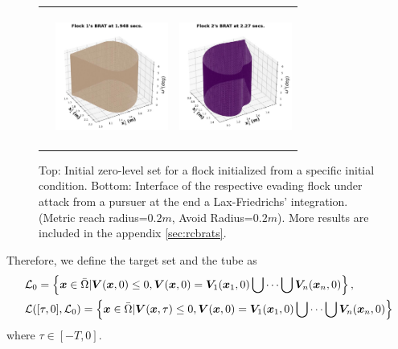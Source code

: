 \begin{figure}[tb!]
\begin{tabular}{ccc}
		&
		\includegraphics[height=12em,width=10em]{figures/flock_1_final.jpg} 
		& 		
		\includegraphics[height=12em,width=10em]{figures/flock_2_final.jpg} 		
	\end{tabular}
	\caption{\footnotesize Top: Initial zero-level set for a flock initialized from a specific initial condition.  Bottom: Interface of the respective evading flock under attack from a pursuer at 
		the end a Lax-Friedrichs' integration.   (Metric reach radius=$0.2m$, Avoid Radius=$0.2m$). More results are included in the appendix \ref{sec:rcbrats}.} 
	\label{fig:flocks_multi}
\end{figure}
%
Therefore, we define the target set and the tube as
%
\begin{align}
	&\mathcal{L}_0 = \left\{ \bm{x} \in \bar{\Omega} | \bm{V}(\bm{x}, 0) \le 0, \bm{V}(\bm{x}, 0) = \bm{V}_1(\bm{x}_1, 0) \bigcup \cdots \bigcup \bm{V}_n(\bm{x}_n, 0)\right\} , \\
	&\mathcal{L}([\tau, 0],  \mathcal{L}_0) = \left\{\bm{x}\in \bar{\Omega}  | \bm{V}(\bm{x}, \tau) \le 0, \bm{V}(\bm{x}, 0) = \bm{V}_1(\bm{x}_1, 0) \bigcup \cdots \bigcup \bm{V}_n(\bm{x}_n, 0)\right\} \nonumber
\end{align}
%
where $\tau \in  [-T, 0]$. 

